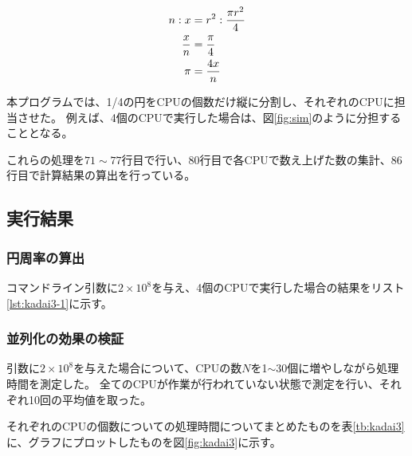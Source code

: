\documentclass[a4j,titlepage]{jsarticle}
\begin{document}
\begin{align}
  n : x &= r^2 : \frac{\pi r^2}{4} \label{eq:monte} \\
  \frac{x}{n} &= \frac{\pi}{4} \notag \\
  \pi &= \frac{4x}{n}
  \label{eq:pi}
\end{align}

本プログラムでは、1/4の円をCPUの個数だけ縦に分割し、それぞれのCPUに担当させた。
例えば、4個のCPUで実行した場合は、図\ref{fig:sim}のように分担することとなる。

これらの処理を$71 \sim 77$行目で行い、80行目で各CPUで数え上げた数の集計、86行目で計算結果の算出を行っている。

\subsection{実行結果}
\subsubsection{円周率の算出}
コマンドライン引数に$2 \times 10^8$を与え、4個のCPUで実行した場合の結果をリスト\ref{lst:kadai3-1}に示す。



\subsubsection{並列化の効果の検証}
引数に$2 \times 10^8$を与えた場合について、CPUの数$N$を1$\sim$30個に増やしながら処理時間を測定した。
全てのCPUが作業が行われていない状態で測定を行い、それぞれ10回の平均値を取った。

それぞれのCPUの個数についての処理時間についてまとめたものを表\ref{tb:kadai3}に、グラフにプロットしたものを図\ref{fig:kadai3}に示す。
\end{document}
